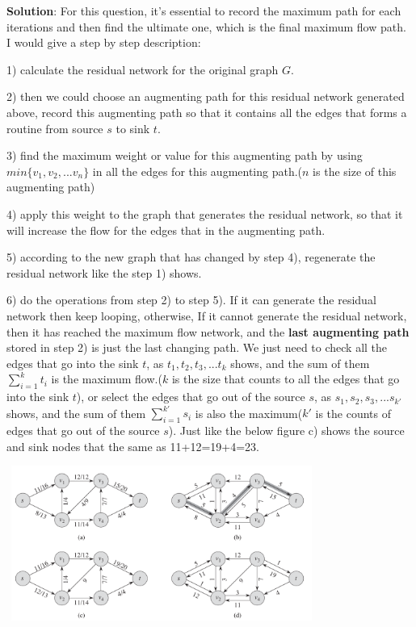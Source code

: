 \documentclass{article}
\begin{document}
\textbf{Solution}: For this question, it's essential to record the maximum path for each iterations and then find the
ultimate one, which is the final maximum flow path. I would give a step by step description:

1) calculate the residual network for the original graph $G$.

2) then we could choose an augmenting path for this residual network generated above, record this augmenting path so
that it contains all the edges that forms a routine from source $s$ to sink $t$.

3) find the maximum weight or value for this augmenting path by using $min\{v_{1}, v_{2}, ... v_{n}\}$ in all the edges
for this augmenting path.($n$ is the size of this augmenting path)

4) apply this weight to the graph that generates the residual network, so that it will increase the flow for the edges
that in the augmenting path.

5) according to the new graph that has changed by step 4), regenerate the residual network like the step 1) shows.

6) do the operations from step 2) to step 5). If it can generate the residual network then keep looping, otherwise, If it cannot generate the residual network, then it has reached the maximum flow network, and the \textbf{last augmenting path} stored in step 2) is just the last changing path. We just need to check all the edges that go into the sink $t$, as ${t_{1}, t_{2}, t_{3}, ... t_{k}}$ shows, and the sum of them $\sum_{i=1}^k{t_i}$ is the maximum flow.($k$ is the size that counts to all the edges that go into the sink $t$), or select the edges that go out of the source $s$, as ${s_{1},s_{2}, s_{3}, ... s_{k\prime}}$ shows, and the sum of them $\sum_{i=1}^{k\prime}{s_i}$ is also the maximum(${k\prime}$ is the counts of edges that go out of the source $s$). Just like the below figure c) shows the source and sink nodes that the same as 11+12=19+4=23.

\begin{center} %
\includegraphics[width=4.00in,height=2.00in]{hw5_2.png}
\end{center}
\end{document}

